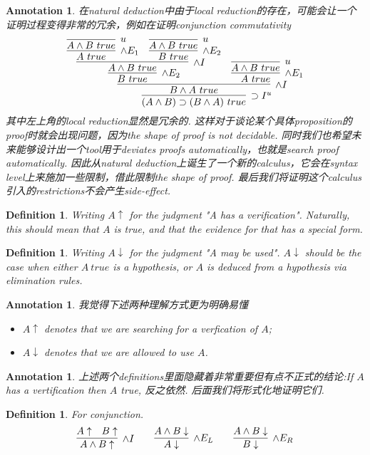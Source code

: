 \documentclass{article}
\theoremstyle{plain}
\newtheorem{definition}[theorem]{Definition}
\newtheorem{annotation}[theorem]{Annotation}
\newcounter{case}
\theoremstyle{nonumberplain}
\begin{document}
\begin{annotation}
\rm \cite{15-317-vu} 在natural deduction中由于local reduction的存在，可能会让一个证明过程变得非常的冗余，例如在证明conjunction commutativity
$$
\infer[\supset I^u]{(A \wedge B) \supset (B \wedge A)~true}{\infer[\wedge I]{B \wedge A~true}{\infer[\wedge E_2]{B~true}{\infer[\wedge I]{A \wedge B~true}{\infer[\wedge E_1]{A~true}{\infer[u]{A \wedge B ~true}{}}  &  \infer[\wedge E_2]{B~true}{\infer[u]{A \wedge B ~true}{}}}}  &  \infer[\wedge E_1]{A~true}{\infer[u]{A \wedge B ~true}{}}}}
$$
其中左上角的local reduction显然是冗余的. 这样对于谈论某个具体proposition的proof时就会出现问题，因为the shape of proof is not decidable. 同时我们也希望未来能够设计出一个tool用于deviates proofs automatically，也就是search proof automatically. 因此从natural deduction上诞生了一个新的calculus，它会在syntax level上来施加一些限制，借此限制the shape of proof. 最后我们将证明这个calculus引入的restrictions不会产生side-effect.   
\end{annotation}


\begin{definition}
\rm Writing $A\uparrow$ for the judgment "A has a verification". Naturally, this should mean that $A$ is true,  and that the evidence for that has a special form.
\end{definition}

\begin{definition}
\rm Writing $A\downarrow$ for the judgment "A may be used". $A\downarrow$ should be the case when either $A~true$ is a hypothesis, or $A$ is deduced from a hypothesis via elimination rules. 
\end{definition}

\begin{annotation}
\rm 我觉得下述两种理解方式更为明确易懂
\begin{itemize}
	\item $A \uparrow$ denotes that we are searching for a verfication of $A$;
	\item $A  \downarrow$ denotes that we are allowed to use $A$. 
\end{itemize}
\end{annotation}

\begin{annotation}
\rm 上述两个definitions里面隐藏着非常重要但有点不正式的结论:If $A$ has a vertification then $A$ true, 反之依然. 后面我们将形式化地证明它们. 
\end{annotation}

\begin{definition}
\rm For conjunction. 
$$
\begin{aligned}
&\infer[\wedge I]{A \wedge B\uparrow}{A \uparrow & B \uparrow} &&& \infer[\wedge E_L]{A \downarrow}{A \wedge B \downarrow} &&&& \infer[\wedge E_R]{B \downarrow}{A \wedge B \downarrow}
\end{aligned}
$$
\end{definition}
\end{document}
